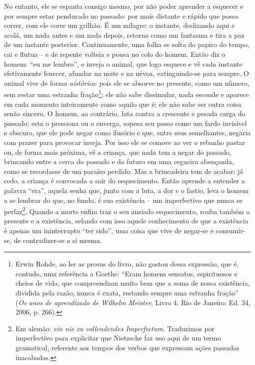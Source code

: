 No entanto, ele se espanta consigo mesmo, por não poder aprender a
esquecer e por sempre estar pendurado no passado: por mais distante e
rápido que possa correr, com ele corre um grilhão. É um milagre: o
instante, deslizando aqui e acolá, um nada antes e um nada depois,
retorna como um fantasma e tira a paz de um instante posterior.
Continuamente, uma folha se solta do papiro do tempo, cai e flutua -- e
de repente volteia e pousa no colo do homem. Então diz o homem: ``eu me
lembro'', e inveja o animal, que logo esquece e vê cada instante
efetivamente fenecer, afundar na noite e na névoa, extinguindo-se para
sempre. O animal vive de forma \emph{aistórica}: pois ele se absorve no
presente, como um número, sem restar uma estranha fração\footnote{Erwin
  Rohde, ao ler as provas do livro, não gostou dessa expressão, que é,
  contudo, uma referência a Goethe: ``Eram homens sensatos, espirituosos
  e cheios de vida, que compreendiam muito bem que a soma de nossa
  existência, dividida pela razão, nunca é exata, restando sempre uma
  estranha fração'' (\emph{Os anos de aprendizado de Wilhelm Meister},
  Livro 4. Rio de Janeiro: Ed. 34, 2006, p. 266).}; ele não sabe
dissimular, nada esconde e aparece em cada momento inteiramente como
aquilo que é; ele não sabe ser outra coisa senão sincero. O homem, ao
contrário, luta contra a crescente e pesada carga do passado: esta o
pressiona ou o enverga, sopesa seu passo como um fardo invisível e
obscuro, que ele pode negar como ilusório e que, entre seus semelhantes,
negaria com prazer para provocar inveja. Por isso ele se comove ao ver
o rebanho pastar ou, de forma mais próxima, vê a criança, que nada tem a
negar do passado, brincando entre a cerca do passado e do futuro em uma
cegueira abençoada, como se recordasse de um paraíso perdido. Mas a
brincadeira tem de acabar: já cedo, a criança é convocada a sair do
esquecimento. Então aprende a entender a palavra ``era'', aquela senha
que, junto com a luta, a dor e o fastio, leva o homem a se lembrar do
que, no fundo, é sua existência -- um imperfectivo que nunca se
perfaz\footnote{Em alemão: \emph{ein nie zu vollendendes Imperfectum}.
  Traduzimos por imperfectivo para explicitar que Nietz\-sche faz uso aqui
  de um termo gramatical, referente aos tempos dos verbos que expressam
  ações passadas inacabadas.}. Quando a morte enfim traz o seu ansiado
esquecimento, rouba também o presente e a existência, selando com
isso aquele conhecimento de que a existência é apenas um ininterrupto
``ter sido'', uma coisa que vive de negar-se e consumir-se, de
contradizer-se a si mesma.

